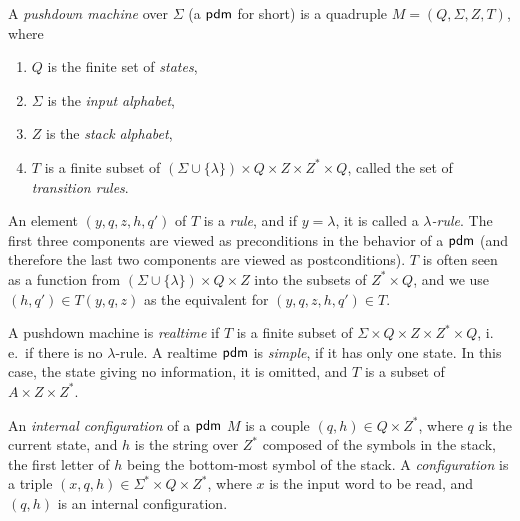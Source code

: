 A \emph{pushdown machine} over $\Sigma$ (a \index{$\pdm$}$\pdm$ for short) is a quadruple $M = (Q, \Sigma, Z, T)$, where

\begin{enumerate}[]
\item $Q$ is the finite set of \emph{states},
\item $\Sigma$ is the \emph{input alphabet},
\item $Z$ is the \emph{stack alphabet},
\item $T$ is a finite subset of $(\Sigma \cup \{\lambda\}) \times Q \times Z \times Z^* \times Q$, called the set of \emph{transition rules}.
\end{enumerate}

An element $(y, q, z, h, q')$ of $T$ is a \emph{rule}, and if $y = \lambda$, it is called a \emph{$\lambda$-rule}. The first three components are viewed as preconditions in the behavior of a $\pdm$ (and therefore the last two components are viewed as postconditions). $T$ is often seen as a function from $(\Sigma \cup \{\lambda\}) \times Q \times Z$ into the subsets of $Z^* \times Q$, and we use $(h, q') \in T(y, q, z)$ as the equivalent for $(y, q, z, h, q') \in T$.

A pushdown machine is \emph{realtime} if $T$ is a finite subset of $\Sigma \times Q \times Z \times Z^* \times Q$, i.\,e.\ if there is no $\lambda$-rule. A realtime $\pdm$ is \emph{simple}, if it has only one state. In this case, the state giving no information, it is omitted, and $T$ is a subset of $A \times Z \times Z^*$.

An \emph{internal configuration} of a $\pdm$ $M$ is a couple $(q, h) \in Q \times Z^*$, where $q$ is the current state, and $h$ is the string over $Z^*$ composed of the symbols in the stack, the first letter of $h$ being the bottom-most symbol of the stack. A \emph{configuration} is a triple $(x, q, h) \in \Sigma^* \times Q \times Z^*$, where $x$ is the input word to be read, and $(q, h)$ is an internal configuration.

